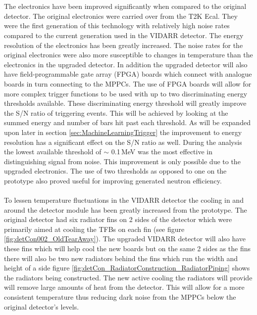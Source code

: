 \\\\The electronics have been improved significantly when compared to the original detector. The original electronics were carried over from the T2K Ecal. They were the first generation of this technology with relatively high noise rates compared to the current generation used in the VIDARR detector. The energy resolution of the electronics has been greatly increased. The noise rates for the original electronics were also more susceptible to changes in temperature than the electronics in the upgraded detector. In addition the upgraded detector will also have field-programmable gate array (FPGA) boards which connect with analogue boards in turn connecting to the MPPCs. The use of FPGA boards will allow for more complex trigger functions to be used with up to two discriminating energy thresholds available. These discriminating energy threshold will greatly improve the S/N ratio of triggering events. This will be achieved by looking at the summed energy and number of bars hit past each threshold. As will be expanded upon later in section \ref{sec:MachineLearningTrigger} the improvement to energy resolution has a significant effect on the S/N ratio as well. During the analysis the lowest available threshold of $\sim$ 0.1\,MeV was the most effective in distinguishing signal from noise. This improvement is only possible due to the upgraded electronics. The use of two thresholds as opposed to one on the prototype also proved useful for improving generated neutron efficiency. 
\\\\To lessen temperature fluctuations in the VIDARR detector the cooling in and around the detector module has been greatly increased from the prototype. The original detector had six radiator fins on 2 sides of the detector which were primarily aimed at cooling the TFBs on each fin (see figure \ref{fig:detCon002_OldTearAway}). The upgraded VIDARR detector will also have these fins which will help cool the new boards but on the same 2 sides as the fins there will also be two new radiators behind the fins which run the width and height of a side figure \ref{fig:detCon_RadiatorConstruction_RadiatorPiping} shows the radiators being constructed. The new active cooling the radiators will provide will remove large amounts of heat from the detector. This will allow for a more consistent temperature  thus reducing dark noise from the MPPCs below the original detector's levels. 

